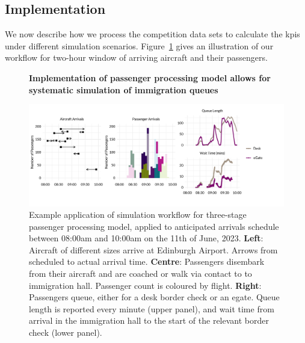 \documentclass[10pt]{article}
\newcommand*{\figuretitle}[1]{%
    {\centering%
    \textbf{#1}%
    \par\medskip}%
}
\begin{document}

\subsection{Implementation}

We now describe how we process the competition data sets to calculate the \glspl{kpi} under different simulation scenarios. Figure~\ref{fig:workflow_fig} gives an illustration of our workflow for two-hour window of arriving aircraft and their passengers. 

\begin{figure}[!ht]
    \centering
    \figuretitle{Implementation of passenger processing model allows for systematic simulation of immigration queues}
    \includegraphics[width=1.1\textwidth]{figures/workflow_fig.png}
     \caption{Example application of simulation workflow for three-stage passenger processing model, applied to anticipated arrivals schedule between 08:00am and 10:00am on the 11th of June, 2023. \textbf{Left}: Aircraft of different sizes arrive at Edinburgh Airport. Arrows from scheduled to actual arrival time. \textbf{Centre}: Passengers disembark from their aircraft and are coached or walk via contact to to immigration hall. Passenger count is coloured by flight. \textbf{Right}: Passengers queue, either for a desk border check or an \gls{egate}. Queue length is reported every minute (upper panel), and wait time from arrival in the immigration hall to the start of the relevant border check (lower panel).} \label{fig:workflow_fig}
\end{figure}
\end{document}

